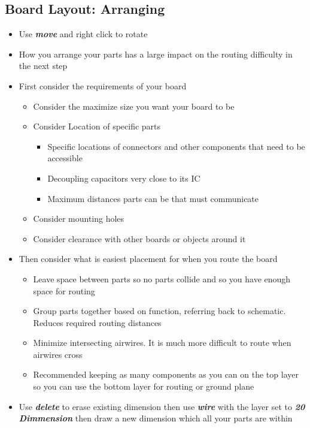 \documentclass{article}
\begin{document}
\subsection{Board Layout: Arranging}
\begin{itemize}
    \item Use \textit{\textbf{move}} and right click to rotate
    \item How you arrange your parts has a large impact on the routing difficulty in the next step
    \item First consider the requirements of your board
    \begin{itemize}
        \item Consider the maximize size you want your board to be
        \item Consider Location of specific parts
        \begin{itemize}
            \item Specific locations of connectors and other components that need to be accessible
            \item Decoupling capacitors very close to its IC
            \item Maximum distances parts can be that must communicate
        \end{itemize}
        \item Consider mounting holes
        \item Consider clearance with other boards or objects around it
    \end{itemize}
    \item Then consider what is easiest placement for when you route the board
    \begin{itemize}
        \item Leave space between parts so no parts collide and so you have enough space for routing
        \item Group parts together based on function, referring back to schematic. Reduces required routing distances
        \item Minimize intersecting airwires. It is much more difficult to route when airwires cross
        \item Recommended keeping as many components as you can on the top layer so you can use the bottom layer for routing or ground plane
    \end{itemize}
    \item Use \textit{\textbf{delete}} to erase existing dimension then use
    \textit{\textbf{wire}} with the layer set to \textit{\textbf{20 Dimmension}} then draw a new dimension which all your parts are within
\end{itemize}
\end{document}
